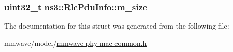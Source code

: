 \subsubsection[{\texorpdfstring{m\+\_\+size}{m_size}}]{\setlength{\rightskip}{0pt plus 5cm}uint32\+\_\+t ns3\+::\+Rlc\+Pdu\+Info\+::m\+\_\+size}\hypertarget{structns3_1_1RlcPduInfo_a02665ffe1c6f3a5c7f7282fe488fdfb3}{}\label{structns3_1_1RlcPduInfo_a02665ffe1c6f3a5c7f7282fe488fdfb3}


The documentation for this struct was generated from the following file\+:\begin{DoxyCompactItemize}
\item 
mmwave/model/\hyperlink{mmwave-phy-mac-common_8h}{mmwave-\/phy-\/mac-\/common.\+h}\end{DoxyCompactItemize}
